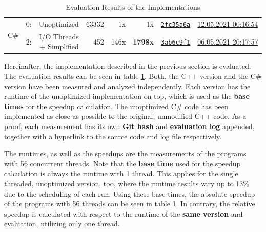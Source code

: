 \begin{table}[bt]
\begin{tabularx}{\textwidth}{clrrrrcX}
        \midrule
        
        \multirow{3}{*}[-0.35em]{C\#} &
        0: &
        Unoptimized &
        63332 &
        1x &
        1x &
        \href{https://se-gitlab.inf.tu-dresden.de/FLWilke/cds-s-2021/-/blob/2fc35a6adcf1e26c341b9d8979d035154efd6b5f/tasks/mopp-2017-t3-mandelbrot-set-c\%23-unoptimized/Program.cs}{\texttt{2fc35a6a}} &
        \href{https://cds-lab.pages.se-gitlab.inf.tu-dresden.de/cds-s-2021/cds-website/logs/c75cb293de1ed36a6bb94494fd0b3b8f3b23c2290f5a165617ce8b8dc5681fe8/2021-05-12T00:16:54+02:00.html}{12.05.2021 00:16:54} \\
        
        \cmidrule{2-8}
        
        &
        2: &
        \makecell{I/O Threads \\+ Simplified} &
        452 &
        146x &
        \textbf{1798x} &
        \href{https://se-gitlab.inf.tu-dresden.de/FLWilke/cds-s-2021/-/blob/3ab6c9f1111b224f0546b0ccb107a86ab7786720/tasks/mopp-2017-t3-mandelbrot-set-c\%23/Program.cs}{\texttt{3ab6c9f1}} &
        \href{https://cds-lab.pages.se-gitlab.inf.tu-dresden.de/cds-s-2021/cds-website/logs/c75cb293de1ed36a6bb94494fd0b3b8f3b23c2290f5a165617ce8b8dc5681fe8/2021-05-06T20:17:57+02:00.html}{06.05.2021 20:17:57} \\
        
        \bottomrule
    \end{tabularx}
    \caption{Evaluation Results of the Implementations}
    \label{tab:evaluation-results}
\end{table}

Hereinafter, the implementation described in the previous section is evaluated. The evaluation results can be seen in table \ref{tab:evaluation-results}. Both, the C++ version and the C\# version have been measured and analyzed independently. Each version has the runtime of the unoptimized implementation on top, which is used as the \textbf{base times} for the speedup calculation. The unoptimized C\# code has been implemented as close as possible to the original, unmodified C++ code. As a proof, each measurement has its own \textbf{Git hash} and \textbf{evaluation log} appended, together with a hyperlink to the source code and log file respectively.

The runtimes, as well as the speedups are the measurements of the programs with 56 concurrent threads. Note that the \textbf{base time} used for the speedup calculation is always the runtime with 1 thread. This applies for the single threaded, unoptimized version, too, where the runtime results vary up to 13\% due to the scheduling of each run. Using these base times, the absolute speedup of the programs with 56 threads can be seen in table \ref{tab:evaluation-results}. In contrary, the relative speedup is calculated with respect to the runtime of the \textbf{same version} and evaluation, utilizing only one thread.

